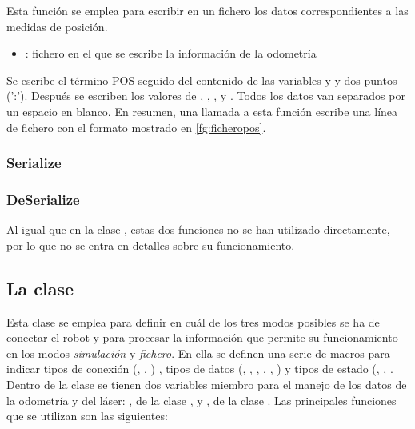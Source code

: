 
\noindent
Esta función se emplea para escribir en un fichero los datos correspondientes a las medidas de posición.

\begin{itemize}
  \item {}: fichero en el que se escribe la información de la odometría
\end{itemize}

\noindent
Se escribe el término POS seguido del contenido de las variables  y  y dos puntos (':'). Después se escriben los valores de , , ,  y . Todos los datos van separados por un espacio en blanco. En resumen, una llamada a esta función escribe una línea de fichero con el formato mostrado en \ref{fg:ficheropos}.

\subsubsection {Serialize}
\subsubsection {DeSerialize}

\vspace{0.2cm}
\noindent
Al igual que en la clase , estas dos funciones no se han utilizado directamente, por lo que no se entra en detalles sobre su funcionamiento.

\subsection{La clase }
Esta clase se emplea para definir en cuál de los tres modos posibles se ha de conectar el robot y para procesar la información que permite su funcionamiento en los modos \emph{simulación} y \emph{fichero}. En ella se definen una serie de macros para indicar tipos de conexión (, , ) , tipos de datos (, , , , , ) y tipos de estado (, , . Dentro de la clase se tienen dos variables miembro para el manejo de los datos de la odometría y del láser: , de la clase , y , de la clase . Las principales funciones que se utilizan son las siguientes:

